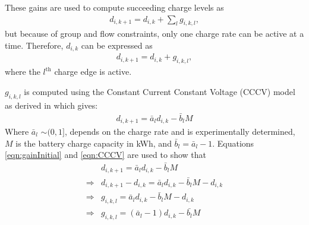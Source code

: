 
These gains are used to compute succeeding charge levels as 
\begin{align}\label{eqn:gainTotal}
	d_{i,k+1} = d_{i,k} +\sum_{l} g_{i,k,l},
\end{align} 
but because of group and flow constraints, only one charge rate can be active at a time. Therefore, $d_{i,k}$ can be expressed as 
\begin{align}\label{eqn:gainInitial}
	d_{i,k+1} = d_{i,k} + g_{i,k,l},
\end{align}
where the $l^{\text{th}}$ charge edge is active. 
\par $g_{i,k,l}$ is computed using the Constant Current Constant Voltage (CCCV) model as derived in \cite{whitaker_network_2021} which gives:
\begin{align}\label{eqn:CCCV}
	d_{i,k+1} = \bar{a}_ld_{i,k} - \bar{b}_lM 
\end{align}
Where $\bar{a}_l$ $\sim(0,1]$, depends on the charge rate and is experimentally determined, $M$ is the battery charge capacity in kWh, and $\bar{b}_l = \bar{a}_l - 1$.
Equations \ref{eqn:gainInitial} and \ref{eqn:CCCV} are used to show that
\begin{equation}\label{eqn:g}
\begin{aligned}
	& d_{i,k+1} = \bar{a}_ld_{i,k} - \bar{b}_lM \\ 
	\Rightarrow & d_{i,k+1} - d_{i,k} = \bar{a}_ld_{i,k} - \bar{b}_lM - d_{i,k}\\
	\Rightarrow & g_{i,k,l}  = \bar{a}_ld_{i,k} - \bar{b}_lM - d_{i,k}\\
	\Rightarrow & g_{i,k,l}  = (\bar{a}_l - 1)d_{i,k} - \bar{b_l}M\\
\end{aligned}
\end{equation}

